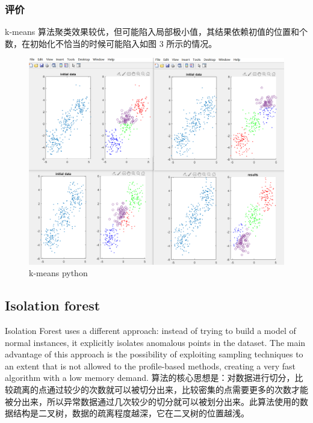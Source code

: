 \documentclass[UTF8]{ctexart}
\begin{document}
        \subsubsection{评价}
            k-means 算法聚类效果较优，但可能陷入局部极小值，其结果依赖初值的位置和个数，在初始化不恰当的时候可能陷入如图 3 所示的情况。
\begin{figure}[ht]
\centering
\includegraphics[scale=0.5]{kmeans_m2.png}
\caption{k-means python}
\end{figure}

    \subsection{Isolation forest}
        Isolation Forest uses a different approach: instead of trying to build a model of normal instances, it explicitly isolates anomalous points in the dataset. The main advantage of this approach is the possibility of exploiting sampling techniques to an extent that is not allowed to the profile-based methods, creating a very fast algorithm with a low memory demand. \cite{4781136} \cite{10.1145/2133360.2133363} 算法的核心思想是：对数据进行切分，比较疏离的点通过较少的次数就可以被切分出来，比较密集的点需要更多的次数才能被分出来，所以异常数据通过几次较少的切分就可以被划分出来。此算法使用的数据结构是二叉树，数据的疏离程度越深，它在二叉树的位置越浅。
\end{document}
